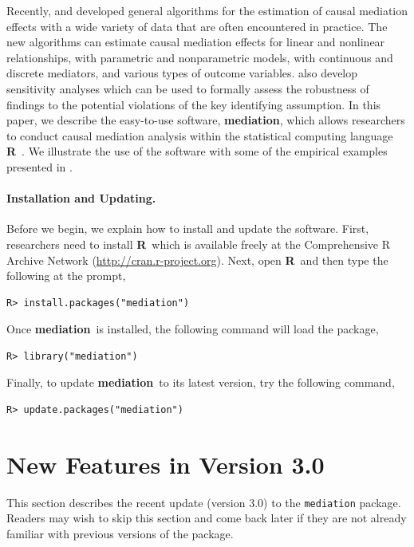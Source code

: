 \documentclass[11pt,letterpaper]{article}
\theoremstyle{plain}
\newcommand\bR{{\bf R}}
\newcommand\bmediation{{\bf mediation}}
\begin{document}
Recently, \citet*{imai:keel:yama:10} and \citet*{imai:keel:ting:10}
developed general algorithms for the estimation of causal mediation
effects with a wide variety of data that are often encountered in
practice.  The new algorithms can estimate causal mediation effects
for linear and nonlinear relationships, with parametric and
nonparametric models, with continuous and discrete mediators, and
various types of outcome variables.
\citet{imai:keel:yama:10,imai:keel:ting:10} also develop sensitivity
analyses which can be used to formally assess the robustness of
findings to the potential violations of the key identifying
assumption.  In this paper, we describe the easy-to-use software,
\bmediation, which allows researchers to conduct causal mediation
analysis within the statistical computing language \bR\ \citep{R:09}.
We illustrate the use of the software with some of the empirical
examples presented in \citet{imai:keel:ting:10}.

\paragraph{Installation and Updating.} Before we begin, we explain how
to install and update the software.  First, researchers need to
install \bR\ which is available freely at the Comprehensive R Archive
Network (\href{http://cran.r-project.org}{http://cran.r-project.org}).
Next, open \bR\ and then type the following at the prompt,
\begin{verbatim}
R> install.packages("mediation")
\end{verbatim}
Once \bmediation\ is installed, the following command will load the package,
\begin{verbatim}
R> library("mediation")
\end{verbatim}
Finally, to update \bmediation\ to its latest version, try the
following command,
\begin{verbatim}
R> update.packages("mediation")
\end{verbatim}

\section{New Features in Version 3.0}

This section describes the recent update (version 3.0) to the {\tt mediation}
package.  Readers may wish to skip this section and come back later if they are
not already familiar with previous versions of the package.
\end{document}
